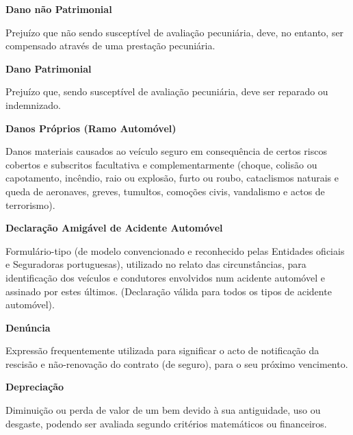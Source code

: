 \begin{description}
\item \textbf{Dano não Patrimonial}

Prejuízo que não sendo susceptível de avaliação pecuniária, deve, no entanto, ser compensado através de uma prestação pecuniária.
\end{description}

\begin{description}
\item \textbf{Dano Patrimonial}

Prejuízo que, sendo susceptível de avaliação pecuniária, deve ser reparado ou indemnizado.
\end{description}

\begin{description}
\item \textbf{Danos Próprios (Ramo Automóvel)}

Danos materiais causados ao veículo seguro em consequência de certos riscos cobertos e subscritos facultativa e complementarmente (choque, colisão ou capotamento, incêndio, raio ou explosão, furto ou roubo, cataclismos naturais e queda de aeronaves, greves, tumultos, comoções civis, vandalismo e actos de terrorismo).
\end{description}

\begin{description}
\item \textbf{Declaração Amigável de Acidente Automóvel}

Formulário-tipo (de modelo convencionado e reconhecido pelas Entidades oficiais e Seguradoras portuguesas), utilizado no relato das circunstâncias, para identificação dos veículos e condutores envolvidos num acidente automóvel e assinado por estes últimos. (Declaração válida para todos os tipos de acidente automóvel).
\end{description}

\begin{description}
\item \textbf{Denúncia}

Expressão frequentemente utilizada para significar o acto de notificação da rescisão e não-renovação do contrato (de seguro), para o seu próximo vencimento.
\end{description}

\begin{description}
\item \textbf{Depreciação}

Diminuição ou perda de valor de um bem devido à sua antiguidade, uso ou desgaste, podendo ser avaliada segundo critérios matemáticos ou financeiros.
\end{description}


